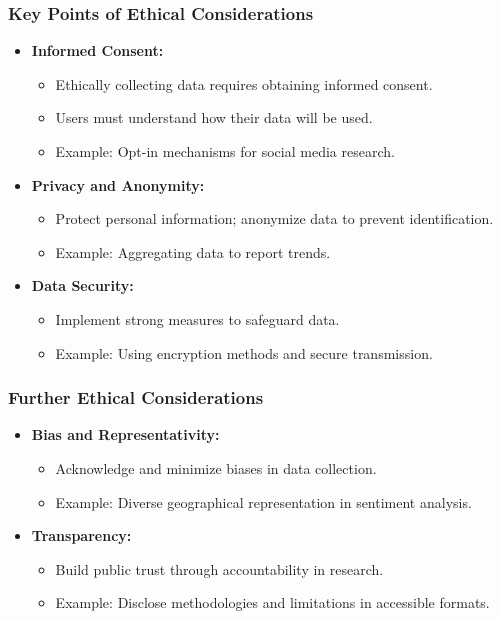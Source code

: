 \documentclass{beamer}
\begin{document}
\begin{frame}[fragile]
    \frametitle{Key Points of Ethical Considerations}

    \begin{itemize}
        \item \textbf{Informed Consent:}
        \begin{itemize}
            \item Ethically collecting data requires obtaining informed consent.
            \item Users must understand how their data will be used.
            \item Example: Opt-in mechanisms for social media research.
        \end{itemize}

        \item \textbf{Privacy and Anonymity:}
        \begin{itemize}
            \item Protect personal information; anonymize data to prevent identification.
            \item Example: Aggregating data to report trends.
        \end{itemize}

        \item \textbf{Data Security:}
        \begin{itemize}
            \item Implement strong measures to safeguard data.
            \item Example: Using encryption methods and secure transmission.
        \end{itemize}
    \end{itemize}
\end{frame}

\begin{frame}[fragile]
    \frametitle{Further Ethical Considerations}

    \begin{itemize}
        \item \textbf{Bias and Representativity:}
        \begin{itemize}
            \item Acknowledge and minimize biases in data collection.
            \item Example: Diverse geographical representation in sentiment analysis.
        \end{itemize}

        \item \textbf{Transparency:}
        \begin{itemize}
            \item Build public trust through accountability in research.
            \item Example: Disclose methodologies and limitations in accessible formats.
        \end{itemize}
    \end{itemize}
\end{frame}
\end{document}
